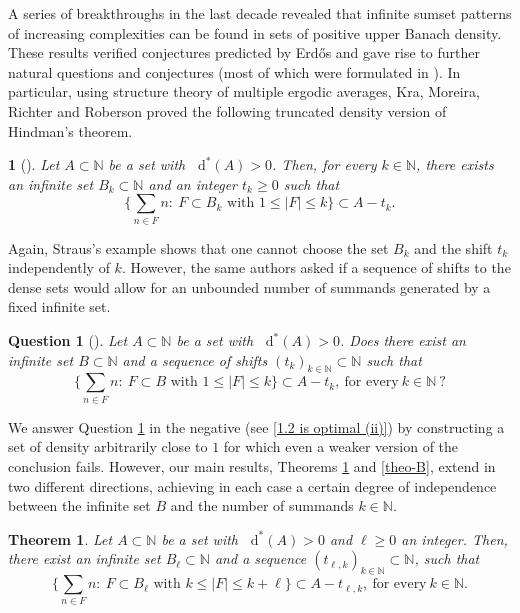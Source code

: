 \documentclass[letter, 11pt]{article}
\makeatletter
\newtheorem{question}[theo]{Question}
\newtheorem{thmx}{Theorem}
\theoremstyle{definition}
\theoremstyle{plain}
\newtheorem*{namedthm}{\namedthmname} %
\newenvironment{named}[2]{%
  \def\namedthmname{#1}%
  \begin{namedthm}[#2]%
  \def\@currentlabelname{#1}%
}{%
  \end{namedthm}%
}
\newcommand{\N}{\mathbb{N}}
\newcommand*\diff{\mathop{}\!\mathrm{d}}
\newcommand{\1}{\mathbbm{1}}
\makeatother
\begin{document}
A series of breakthroughs in the last decade \cite{diNasso_Golbring_Jin_Leth_Lupini_Mahlburg2015sumset,host2019short,Kra_Moreira_Richter_Robertson:2022,Kra_Moreira_Richter_Robertson:2023,kmrr25, Moreira_Richter_Robertson19} revealed that infinite sumset patterns of increasing complexities can be found in sets of positive upper Banach density. These results 
verified conjectures predicted by Erd\H{o}s and gave rise to further natural questions and conjectures (most of which were formulated in \cite{Kra_Moreira_Richter_Robertson_problems}). In particular, using structure theory of multiple ergodic averages, Kra, Moreira, Richter and Roberson proved the following truncated density version of Hindman's theorem.
\begin{named}{Theorem KMRR}{{\cite[Theorem 1.1]{kmrr25}}}\label{main theorem kmrr 1}
Let $A\subset \N$ be a set with $\diff^*(A)>0$. Then, for every $k\in \N$, there exists an infinite set $B_k \subset \N$ and an integer $t_k\geq 0$ such that 
\begin{equation*} 
    \bigg\{ \sum_{n\in F} n \colon \ F\subset B_k \text{ with } 1\leq |F|\leq k \bigg\} \subset A-t_k.
\end{equation*}
\end{named}
Again, Straus's example shows that one 
cannot choose the set $B_k$ and the shift $t_k$ independently of $k$.
However, the same authors asked if a sequence of shifts to the dense sets would allow for an unbounded number of summands generated by a fixed infinite set.
\begin{question}[{\cite[Question 2.11]{Kra_Moreira_Richter_Robertson_problems}}]  \label{question kmrr intro}
Let $A\subset \N$ be a set with $\diff^*(A)>0$. Does there exist an infinite set $B \subset \N$ and a sequence of shifts $(t_k)_{k\in \N}\subset \N$ such that
$$ \bigg\{ \sum_{n\in F} n \colon \ F\subset B \text{ with } 1\leq |F|\leq k \bigg\} \subset A-t_k,\ \text{for every}\ k\in \N\ ?$$
\end{question}

We answer Question \ref{question kmrr intro} 
in the negative (see \cref{1.2 is optimal (ii)}) by constructing a set of density 
arbitrarily close to $1$ for which even a weaker version of the conclusion  
fails. However, our main results, Theorems \ref{theo-A} and \ref{theo-B}, extend 
 in two different directions, achieving in each case a certain degree of independence between the infinite set $B$ and the number of summands $k \in \N$. 
\begin{thmx}\label{theo-A}
    Let $A\subset\N$ be a set with $\diff^*(A)>0$ and $\ell\geq 0$ an integer. Then, there exist an infinite set $B_{\ell} \subset \N$ and a sequence $(t_{\ell,k})_{k\in \N}\subset \N$, such that 
        $$ \bigg\{ \sum_{n\in F} n \colon \ F\subset B_{\ell} \text{ with } k\leq |F|\leq k+ \ell \bigg\} \subset A-t_{\ell,k}, \ \text{for every}\ k\in \N.$$
\end{thmx}
\end{document}
